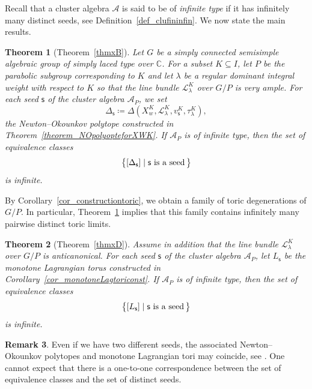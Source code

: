 \documentclass[11pt]{amsart}
\newcommand{\C}{\mathbb{C}}
\def\mcal{\mathcal}
\numberwithin{equation}{section}
\theoremstyle{plain}
\newtheorem{theorem}{Theorem}[section]
\theoremstyle{definition}
\newtheorem{remark}[theorem]{Remark}
\numberwithin{equation}{section}
\newcommand{\seed}{\mathsf{s}}
\begin{document}
Recall that a cluster algebra $\mcal{A}$ is said to be of \emph{infinite type} if it has infinitely many distinct seeds, see Definition~\ref{def_clufininfin}. We now state the main results. 

\begin{theorem}[Theorem~\ref{thmxB}]\label{theorem_distinguishGP}
Let $G$ be a simply connected semisimple algebraic group of simply laced type over $\C$. For a subset $K \subseteq I$, let $P$ be the parabolic subgroup corresponding to $K$ and let $\lambda$ be a regular dominant integral weight with respect to $K$ so that the line bundle $\mcal{L}^K_\lambda$ over $G/P$ is very ample. For each seed $\seed$ of the cluster algebra $\mcal{A}_{P}$, we set 
$$
\Delta_\seed \coloneqq \Delta(X_w^K, \mcal{L}^K_\lambda, v^K_\seed, \tau^K_\lambda),  
$$
the Newton--Okounkov polytope constructed in Theorem~\ref{theorem_NOpolyopteforXWK}. If $\mcal{A}_P$ is of infinite type, then the set of equivalence classes 
\begin{equation}\label{equ_NOpolyseed}
\bigl\{ [\Delta_\seed] \mid\mbox{$\seed$ is a seed\,} \bigr\}
\end{equation}
is infinite.
\end{theorem}

By Corollary~\ref{cor_constructiontoric}, we obtain a family of toric degenerations of $G/P$. In particular, Theorem~\ref{theorem_distinguishGP} implies that this family contains infinitely many pairwise distinct toric limits.

\begin{theorem}[Theorem~\ref{thmxD}]\label{theorem_distinguishGPmonotone}
Assume in addition that the line bundle $\mcal{L}^K_\lambda$ over $G/P$ is anticanonical. For each seed $\seed$ of the cluster algebra $\mcal{A}_P$, let $L_\seed$ be the monotone Lagrangian torus constructed in Corollary~\ref{cor_monotoneLagtoriconst}. If $\mcal{A}_P$ is of infinite type, then the set of equivalence classes 
$$
\bigl\{ [L_\seed] \mid \mbox{$\seed$ is a seed\,} \bigr\}
$$
is infinite.
\end{theorem}

\begin{remark}\label{remark_sameobjdifseed}
Even if we have two different seeds, the associated Newton--Okounkov polytopes and monotone Lagrangian tori may coincide, see \cite{CKLP21,Kim24}. One cannot expect that there is a one-to-one correspondence between the set of equivalence classes and the set of distinct seeds. 
\end{remark}
\end{document}
